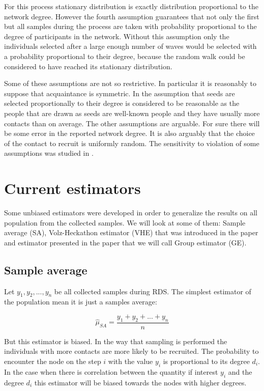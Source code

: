 \documentclass[12pt]{report}
\begin{document}
For this process stationary distribution is exactly distribution proportional to the network degree. However the fourth assumption guarantees that not only the first but all samples during the process are taken with probability proportional to the degree of participants in the network. Without this assumption only the individuals selected after a large enough number of waves would be selected with a probability proportional to their degree, because the random walk could be considered to have reached its stationary distribution. 

Some of these assumptions are not so restrictive. In particular it is reasonably to suppose that acquaintance is symmetric. In \cite{salganik2004sampling} the assumption that seeds are selected proportionally to their degree is considered to be reasonable as the people that are drawn as seeds are well-known people and they have usually more contacts than on average. The other assumptions are arguable. For sure there will be some error in the reported network degree. It is also arguably that the choice of the contact to recruit is uniformly random. The sensitivity to violation of some assumptions was studied in \cite{gile2010respondent}. 


\section{Current estimators}
\label{sec:Current estimators}

Some unbiased estimators were developed in order to generalize the results on all population from the collected samples. We will look at some of them: Sample average (SA), Volz-Heckathon estimator (VHE) that was introduced in the paper \cite{volz2008probability} and estimator presented in the paper \cite{salganik2004sampling} that we will call Group estimator (GE). 

\subsection{Sample average}

Let $y_1, y_2, ..., y_n$ be all collected samples during RDS. The simplest estimator of the population mean it is just a samples average:

$$ \widehat{\mu}_{SA} = \frac{y_1 + y_2 + ... + y_n}{n}$$

But this estimator is biased. In the way that sampling is performed the individuals with more contacts are more likely to be recruited. The probability to encounter the node on the step $i$ with the value $y_i$ is proportional to its degree $d_i$.
In the case when there is correlation between the quantity if interest $y_i$ and the degree $d_i$ this estimator will be biased towards the nodes with higher degrees.
\end{document}
